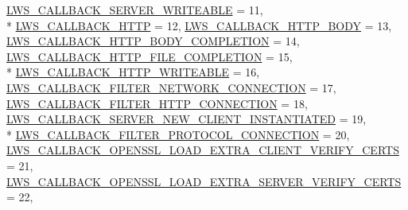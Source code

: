 \begin{DoxyCompactItemize}
\hyperlink{group__usercb_ggad62860e19975ba4c4af401c3cdb6abf7a7ec8e2e9557ee02a4fc9f7dec7e2babc}{L\+W\+S\+\_\+\+C\+A\+L\+L\+B\+A\+C\+K\+\_\+\+S\+E\+R\+V\+E\+R\+\_\+\+W\+R\+I\+T\+E\+A\+B\+LE} = 11, 
\\*
\hyperlink{group__usercb_ggad62860e19975ba4c4af401c3cdb6abf7ae8d1de0bb56e03aa58cb4d44b18edd2e}{L\+W\+S\+\_\+\+C\+A\+L\+L\+B\+A\+C\+K\+\_\+\+H\+T\+TP} = 12, 
\hyperlink{group__usercb_ggad62860e19975ba4c4af401c3cdb6abf7ac4c68e00efcf1ff7bda7ada462aff8ae}{L\+W\+S\+\_\+\+C\+A\+L\+L\+B\+A\+C\+K\+\_\+\+H\+T\+T\+P\+\_\+\+B\+O\+DY} = 13, 
\hyperlink{group__usercb_ggad62860e19975ba4c4af401c3cdb6abf7a2fce9a8608220f32abbf1422a5498804}{L\+W\+S\+\_\+\+C\+A\+L\+L\+B\+A\+C\+K\+\_\+\+H\+T\+T\+P\+\_\+\+B\+O\+D\+Y\+\_\+\+C\+O\+M\+P\+L\+E\+T\+I\+ON} = 14, 
\hyperlink{group__usercb_ggad62860e19975ba4c4af401c3cdb6abf7aa627548e1296e654fcfab463ec3c9587}{L\+W\+S\+\_\+\+C\+A\+L\+L\+B\+A\+C\+K\+\_\+\+H\+T\+T\+P\+\_\+\+F\+I\+L\+E\+\_\+\+C\+O\+M\+P\+L\+E\+T\+I\+ON} = 15, 
\\*
\hyperlink{group__usercb_ggad62860e19975ba4c4af401c3cdb6abf7afedadfb3cde37a8ea4c84ed535f26d09}{L\+W\+S\+\_\+\+C\+A\+L\+L\+B\+A\+C\+K\+\_\+\+H\+T\+T\+P\+\_\+\+W\+R\+I\+T\+E\+A\+B\+LE} = 16, 
\hyperlink{group__usercb_ggad62860e19975ba4c4af401c3cdb6abf7a026502768778b8d79d62dd0fe4375fc6}{L\+W\+S\+\_\+\+C\+A\+L\+L\+B\+A\+C\+K\+\_\+\+F\+I\+L\+T\+E\+R\+\_\+\+N\+E\+T\+W\+O\+R\+K\+\_\+\+C\+O\+N\+N\+E\+C\+T\+I\+ON} = 17, 
\hyperlink{group__usercb_ggad62860e19975ba4c4af401c3cdb6abf7a75199176c82c1a56e4a6bbf1cc30c12c}{L\+W\+S\+\_\+\+C\+A\+L\+L\+B\+A\+C\+K\+\_\+\+F\+I\+L\+T\+E\+R\+\_\+\+H\+T\+T\+P\+\_\+\+C\+O\+N\+N\+E\+C\+T\+I\+ON} = 18, 
\hyperlink{group__usercb_ggad62860e19975ba4c4af401c3cdb6abf7ae9734e1d7af2abf291665ce9e4a728d3}{L\+W\+S\+\_\+\+C\+A\+L\+L\+B\+A\+C\+K\+\_\+\+S\+E\+R\+V\+E\+R\+\_\+\+N\+E\+W\+\_\+\+C\+L\+I\+E\+N\+T\+\_\+\+I\+N\+S\+T\+A\+N\+T\+I\+A\+T\+ED} = 19, 
\\*
\hyperlink{group__usercb_ggad62860e19975ba4c4af401c3cdb6abf7accd8753672d319a30b4b4c2fb775e84d}{L\+W\+S\+\_\+\+C\+A\+L\+L\+B\+A\+C\+K\+\_\+\+F\+I\+L\+T\+E\+R\+\_\+\+P\+R\+O\+T\+O\+C\+O\+L\+\_\+\+C\+O\+N\+N\+E\+C\+T\+I\+ON} = 20, 
\hyperlink{group__usercb_ggad62860e19975ba4c4af401c3cdb6abf7ae4986291b7a810fe290851d73bebeb1c}{L\+W\+S\+\_\+\+C\+A\+L\+L\+B\+A\+C\+K\+\_\+\+O\+P\+E\+N\+S\+S\+L\+\_\+\+L\+O\+A\+D\+\_\+\+E\+X\+T\+R\+A\+\_\+\+C\+L\+I\+E\+N\+T\+\_\+\+V\+E\+R\+I\+F\+Y\+\_\+\+C\+E\+R\+TS} = 21, 
\hyperlink{group__usercb_ggad62860e19975ba4c4af401c3cdb6abf7a06006e98d27e1e884364d88317f83493}{L\+W\+S\+\_\+\+C\+A\+L\+L\+B\+A\+C\+K\+\_\+\+O\+P\+E\+N\+S\+S\+L\+\_\+\+L\+O\+A\+D\+\_\+\+E\+X\+T\+R\+A\+\_\+\+S\+E\+R\+V\+E\+R\+\_\+\+V\+E\+R\+I\+F\+Y\+\_\+\+C\+E\+R\+TS} = 22, 

\end{DoxyCompactItemize}
